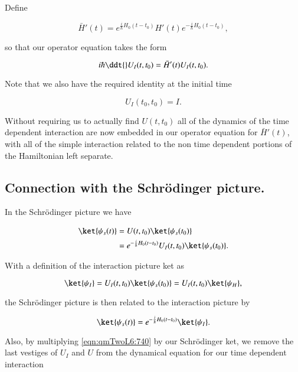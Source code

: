 Define 

\begin{equation}\label{eqn:qmTwoL6:720}
\bar{H}'(t) =
e^{\frac{i}{\hbar} H_0(t - t_0)} H'(t) e^{-\frac{i}{\hbar} H_0(t - t_0)},
\end{equation}

so that our operator equation takes the form

\begin{equation}\label{eqn:qmTwoL6:740}
i \hbar \ddt{} U_I(t, t_0) = \bar{H}'(t) U_I(t, t_0).
\end{equation}

Note that we also have the required identity at the initial time

\begin{equation}\label{eqn:qmTwoL6:760}
U_I(t_0, t_0) = I.
\end{equation}

Without requiring us to actually find $U(t, t_0)$ all of the dynamics of the time dependent interaction are now embedded in our operator equation for $\bar{H}'(t)$, with all of the simple interaction related to the non time dependent portions of the Hamiltonian left separate.

\subsection{Connection with the Schr\"{o}dinger picture.}

In the Schr\"{o}dinger picture we have

\begin{align*}
\ket{\psi_s(t)} 
&= U(t, t_0) 
\ket{\psi_s(t_0)}  \\
&=
e^{-\frac{i}{\hbar} H_0(t - t_0)} U_I(t, t_0)
\ket{\psi_s(t_0)}.
\end{align*}

With a definition of the interaction picture ket as

\begin{equation}\label{eqn:qmTwoL6:780}
\ket{\psi_I} 
= U_I(t, t_0) \ket{\psi_s(t_0)} = U_I(t, t_0) \ket{\psi_H},
\end{equation}

the Schr\"{o}dinger picture is then related to the interaction picture by

\begin{equation}\label{eqn:qmTwoL6:800}
\ket{\psi_s(t)} = e^{-\frac{i}{\hbar} H_0(t - t_0)} \ket{\psi_I}.
\end{equation}

Also, by multiplying \ref{eqn:qmTwoL6:740} by our Schr\"{o}dinger ket, we remove the last vestiges of $U_I$ and $U$ from the dynamical equation for our time dependent interaction

